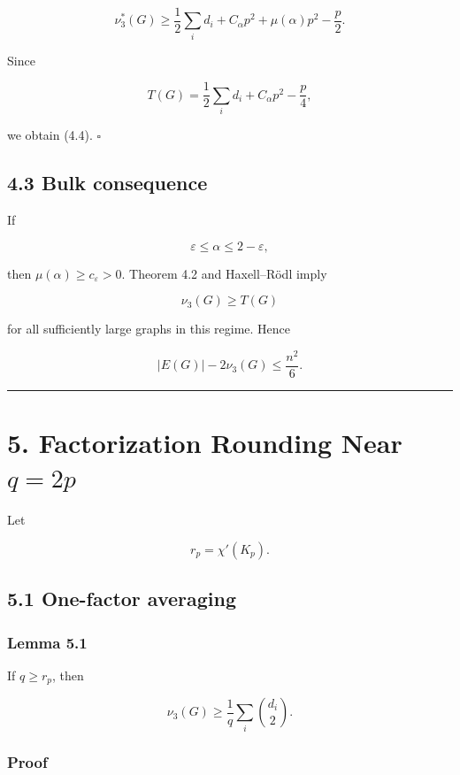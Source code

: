 \documentclass[
  11pt,
]{article}
\begin{document}
\[
\nu_3^*(G)
\ge
\frac12\sum_i d_i+C_\alpha p^2+\mu(\alpha)p^2-\frac p2.
\]

Since

\[
T(G)=\frac12\sum_i d_i+C_\alpha p^2-\frac p4,
\]

we obtain (4.4). \(\square\)

\subsection{4.3 Bulk consequence}\label{bulk-consequence}

If

\[
\varepsilon\le\alpha\le2-\varepsilon,
\]

then \(\mu(\alpha)\ge c_\varepsilon>0\). Theorem 4.2 and Haxell--Rödl
imply

\[
\nu_3(G)\ge T(G)
\]

for all sufficiently large graphs in this regime. Hence

\[
|E(G)|-2\nu_3(G)
\le
\frac{n^2}{6}.
\tag{4.6}
\]

\begin{center}\rule{0.5\linewidth}{0.5pt}\end{center}

\section{\texorpdfstring{5. Factorization Rounding Near
\(q=2p\)}{5. Factorization Rounding Near q=2p}}\label{factorization-rounding-near-q2p}

Let

\[
r_p=\chi'(K_p).
\]

\subsection{5.1 One-factor averaging}\label{one-factor-averaging}

\subsubsection{Lemma 5.1}\label{lemma-5.1}

If \(q\ge r_p\), then

\[
\boxed{
\nu_3(G)
\ge
\frac1q\sum_i\binom{d_i}{2}.
}
\tag{5.1}
\]

\subsubsection{Proof}\label{proof-3}
\end{document}
